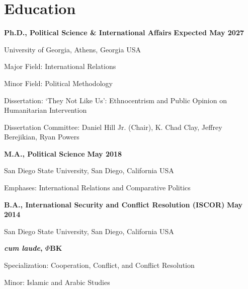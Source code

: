 \documentclass[letterpaper,12pt]{article}
\newenvironment{list1}{
  \begin{list}{}{
      \setlength{\itemsep}{0in}
      \setlength{\parsep}{0in} \setlength{\parskip}{0in}
      \setlength{\topsep}{0in} \setlength{\partopsep}{0in} 
      \setlength{\leftmargin}{0in}}}{\end{list}}
\begin{document}
\section{Education}
{\bf Ph.D., Political Science \& International Affairs} \hfill {\bf Expected May 2027}
\begin{list1} 
\item University of Georgia, Athens, Georgia USA
\item Major Field: International Relations
\item Minor Field: Political Methodology
\item Dissertation: `They Not Like Us': Ethnocentrism and Public Opinion on Humanitarian Intervention
\item Dissertation Committee:  Daniel Hill Jr. (Chair), K. Chad Clay, Jeffrey Berejikian, Ryan Powers
\end{list1}
\par
{\bf M.A., Political Science} \hfill {\bf May 2018}
\begin{list1} 
\item San Diego State University, San Diego, California USA
\item Emphases: International Relations and Comparative Politics
\end{list1}
\par
{\bf B.A., International Security and Conflict Resolution (ISCOR)} \hfill {\bf May 2014}
\begin{list1} 
\item San Diego State University, San Diego, California USA
\item \textbf{\textit{cum laude}, $\Phi$BK}
\item Specialization: Cooperation, Conflict, and Conflict Resolution
\item Minor: Islamic and Arabic Studies
\end{list1}

\end{document}
